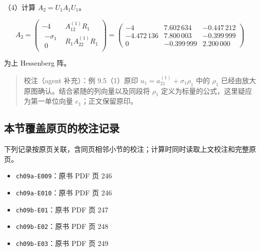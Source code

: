 \documentclass[
  10pt,
  fontset=fandol]{ctexart}
\providecommand{\tightlist}{%
  \setlength{\itemsep}{0pt}\setlength{\parskip}{0pt}}
\begin{document}
（4）计算 \(A_2=U_1A_1U_1\)。

\[
A_2=\begin{pmatrix}-4&A_{12}^{(1)}R_1\\
\begin{matrix}-\sigma_1\\0\end{matrix}&R_1A_{22}^{(1)}R_1
\end{pmatrix}
=\begin{pmatrix}
-4&7.602\,634&-0.447\,212\\
-4.472\,136&7.800\,003&-0.399\,999\\
0&-0.399\,999&2.200\,000
\end{pmatrix}
\]

为上 Hessenberg 阵。

\begin{quote}
校注（agent 补充）：例 9.5（1）原印 \(u_1=a_{21}^{(1)}+\sigma_1\rho_1\) 中的 \(\rho_1\) 已经由放大原图确认。结合紧随的列向量以及同段将 \(\rho_1\) 定义为标量的公式，这里疑应为第一单位向量 \(e_1\)；正文保留原印。
\end{quote}

\subsection{本节覆盖原页的校注记录}\label{ux672cux8282ux8986ux76d6ux539fux9875ux7684ux6821ux6ce8ux8bb0ux5f55}

下列记录按原页关联，含同页相邻小节的校注；计算时同时读取上文校注和完整原页。

\begin{itemize}
\tightlist
\item
  \texttt{ch09a-E009}：原书 PDF 页 246
\item
  \texttt{ch09a-E010}：原书 PDF 页 246
\item
  \texttt{ch09b-E01}：原书 PDF 页 247
\item
  \texttt{ch09b-E02}：原书 PDF 页 248
\item
  \texttt{ch09b-E03}：原书 PDF 页 249
\end{itemize}
\end{document}
